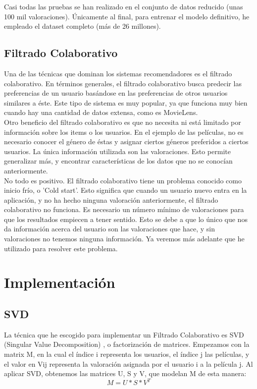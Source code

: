 \documentclass[a4paper, 11pt]{article}
\begin{document}
    	\noindent  Casi todas las pruebas se han realizado en el conjunto de datos reducido (unas 100 mil valoraciones). Únicamente al final, para entrenar el modelo definitivo, he empleado el dataset completo (más de 26 millones).
     	\subsection{Filtrado Colaborativo}
     	\noindent Una de las técnicas que dominan los sistemas recomendadores es el filtrado colaborativo. En términos generales, el filtrado colaborativo busca predecir las preferencias de un usuario basándose en las preferencias de otros usuarios similares a éste. Este tipo de sistema es muy popular, ya que funciona muy bien cuando hay una cantidad de datos extensa, como es MovieLens.  \\
     	
     	\noindent Otro beneficio del filtrado colaborativo es que no necesita ni está limitado por información sobre los items o los usuarios. En el ejemplo de las películas, no es necesario conocer el género de éstas y asignar ciertos géneros preferidos a ciertos usuarios. La única información utilizada son las valoraciones. Esto permite generalizar más, y encontrar características de los datos que no se conocían anteriormente. \\
     	
     	\noindent No todo es positivo. El filtrado colaborativo tiene un problema conocido como inicio frío, o 'Cold start'. Esto significa que cuando un usuario nuevo entra en la aplicación, y no ha hecho ninguna valoración anteriormente, el filtrado colaborativo no funciona. Es necesario un número mínimo de valoraciones para que los resultados empiecen a tener sentido. Esto se debe a que lo único que nos da información acerca del usuario son las valoraciones que hace, y sin valoraciones no tenemos ninguna información. Ya veremos más adelante que he utilizado para resolver este problema. 

    \section{Implementación}
    	\subsection{SVD}
    		\noindent La técnica que he escogido para implementar un Filtrado Colaborativo es SVD (Singular Value Decomposition) \cite{svd}, o factorización de matrices. Empezamos con la matrix M, en la cual el índice i representa los usuarios, el índice j las películas, y el valor en Vij representa la valoración asignada por el usuario i a la película j. Al aplicar SVD, obtenemos las matrices U, S y V, que modelan M de esta manera:
    		\begin{equation*}
    		M = U * S * V^T
    		\end{equation*}
    		
\end{document}
